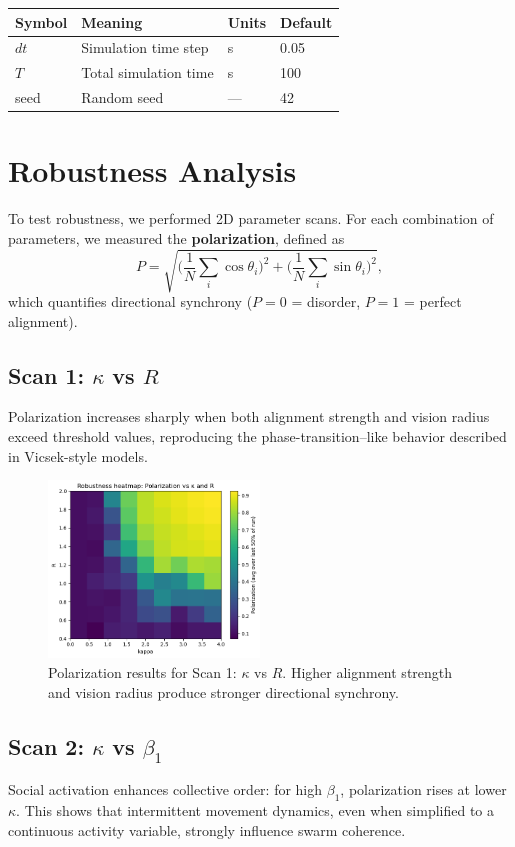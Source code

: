 \documentclass[11pt,a4paper]{article}
\begin{document}
\begin{tabular}{@{}llll@{}}
\toprule
Symbol & Meaning & Units & Default \\
\midrule
$dt$ & Simulation time step & s & 0.05 \\
$T$ & Total simulation time & s & 100 \\
seed & Random seed & --- & 42 \\
\bottomrule
\end{tabular}

\section{Robustness Analysis}

To test robustness, we performed 2D parameter scans. For each combination of parameters, we measured the \textbf{polarization}, defined as
\[
P = \sqrt{\Big(\frac{1}{N}\sum_i \cos \theta_i\Big)^2 + \Big(\frac{1}{N}\sum_i \sin \theta_i\Big)^2},
\]
which quantifies directional synchrony ($P=0$ = disorder, $P=1$ = perfect alignment).

\subsection{Scan 1: $\kappa$ vs $R$}
Polarization increases sharply when both alignment strength and vision radius exceed threshold values, reproducing the phase-transition–like behavior described in Vicsek-style models.

\begin{figure}[H]
    \centering
    \includegraphics[width=0.5\textwidth]{k_vs_r.png}
    \caption{Polarization results for Scan 1: $\kappa$ vs $R$. 
    Higher alignment strength and vision radius produce stronger directional synchrony.}
    \label{fig:scan1}
\end{figure}


\subsection{Scan 2: $\kappa$ vs $\beta_1$}
Social activation enhances collective order: for high $\beta_1$, polarization rises at lower $\kappa$. This shows that intermittent movement dynamics, even when simplified to a continuous activity variable, strongly influence swarm coherence.
\end{document}
